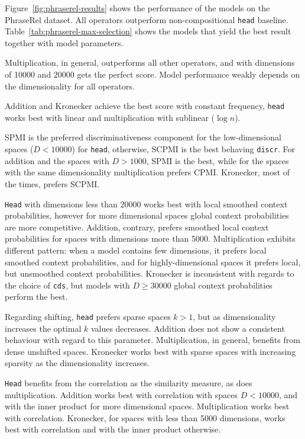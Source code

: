 

Figure~\ref{fig:phraserel-results} shows the performance of the models on the PhraseRel dataset. All operators outperform non-compositional \texttt{head} baseline. Table~\ref{tab:phraserel-max-selection} shows the models that yield the best result together with model parameters.

Multiplication, in general, outperforms all other operators, and with dimensions of 10000 and 20000 gets the perfect score. Model performance weakly depends on the dimensionality for all operators.

Addition and Kronecker achieve the best score with constant frequency, \texttt{head} works best with linear and multiplication with sublinear ($\log n$).

SPMI is the preferred discriminativeness component for the low-dimensional spaces ($D < 10000$) for \texttt{head}, otherwise, SCPMI is the best behaving \texttt{discr}. For addition and the spaces with $D > 1000$, SPMI is the best, while for the spaces with the same dimensionality multiplication prefers CPMI. Kronecker, most of the times, prefers SCPMI.

\texttt{Head} with dimensions less than 20000 works best with local smoothed context probabilities, however for more dimensional spaces global context probabilities are more competitive. Addition, contrary, prefers smoothed local context probabilities for spaces with dimensions more than 5000. Multiplication exhibits different pattern: when a model contains few dimensions, it prefers local smoothed context probabilities, and for highly-dimensional spaces it prefers local, but unsmoothed context probabilities. Kronecker is inconsistent with regards to the choice of \texttt{cds}, but models with $D \geq 30000$ global context probabilities perform the best.

Regarding shifting, \texttt{head} prefers sparse spaces $k > 1$, but as dimensionality increases the optimal $k$ values decreases. Addition does not show a consistent behaviour with regard to this parameter. Multiplication, in general, benefits from dense unshifted spaces. Kronecker works best with sparse spaces with increasing sparsity as the dimensionality increases.

\texttt{Head} benefits from the correlation as the similarity measure, as does multiplication. Addition works best with correlation with spaces $D < 10000$, and with the inner product for more dimensional spaces. Multiplication works best with correlation. Kronecker, for spaces with less than 5000 dimensions, works best with correlation and with the inner product otherwise.

